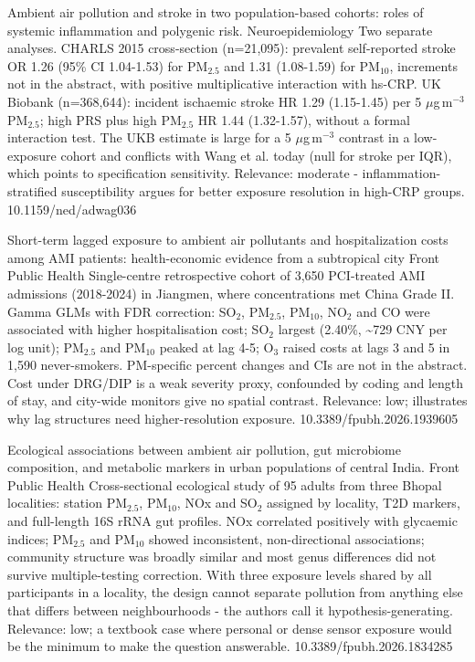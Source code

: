 \documentclass[10pt]{article}
\begin{document}
{Ambient air pollution and stroke in two population-based cohorts: roles of systemic inflammation and polygenic risk.}
{Neuroepidemiology}
{Two separate analyses. CHARLS 2015 cross-section (n=21,095): prevalent self-reported stroke OR 1.26 (95\% CI 1.04-1.53) for PM$_{2.5}$ and 1.31 (1.08-1.59) for PM$_{10}$, increments not in the abstract, with positive multiplicative interaction with hs-CRP. UK Biobank (n=368,644): incident ischaemic stroke HR 1.29 (1.15-1.45) per 5 $\mu$g\,m$^{-3}$ PM$_{2.5}$; high PRS plus high PM$_{2.5}$ HR 1.44 (1.32-1.57), without a formal interaction test. The UKB estimate is large for a 5 $\mu$g\,m$^{-3}$ contrast in a low-exposure cohort and conflicts with Wang et al. today (null for stroke per IQR), which points to specification sensitivity. Relevance: moderate - inflammation-stratified susceptibility argues for better exposure resolution in high-CRP groups.}
{10.1159/ned/adwag036}

{Short-term lagged exposure to ambient air pollutants and hospitalization costs among AMI patients: health-economic evidence from a subtropical city}
{Front Public Health}
{Single-centre retrospective cohort of 3,650 PCI-treated AMI admissions (2018-2024) in Jiangmen, where concentrations met China Grade II. Gamma GLMs with FDR correction: SO$_2$, PM$_{2.5}$, PM$_{10}$, NO$_2$ and CO were associated with higher hospitalisation cost; SO$_2$ largest (2.40\%, \textasciitilde{}729 CNY per log unit); PM$_{2.5}$ and PM$_{10}$ peaked at lag 4-5; O$_3$ raised costs at lags 3 and 5 in 1,590 never-smokers. PM-specific percent changes and CIs are not in the abstract. Cost under DRG/DIP is a weak severity proxy, confounded by coding and length of stay, and city-wide monitors give no spatial contrast. Relevance: low; illustrates why lag structures need higher-resolution exposure.}
{10.3389/fpubh.2026.1939605}

{Ecological associations between ambient air pollution, gut microbiome composition, and metabolic markers in urban populations of central India.}
{Front Public Health}
{Cross-sectional ecological study of 95 adults from three Bhopal localities: station PM$_{2.5}$, PM$_{10}$, NOx and SO$_2$ assigned by locality, T2D markers, and full-length 16S rRNA gut profiles. NOx correlated positively with glycaemic indices; PM$_{2.5}$ and PM$_{10}$ showed inconsistent, non-directional associations; community structure was broadly similar and most genus differences did not survive multiple-testing correction. With three exposure levels shared by all participants in a locality, the design cannot separate pollution from anything else that differs between neighbourhoods - the authors call it hypothesis-generating. Relevance: low; a textbook case where personal or dense sensor exposure would be the minimum to make the question answerable.}
{10.3389/fpubh.2026.1834285}
\end{document}
